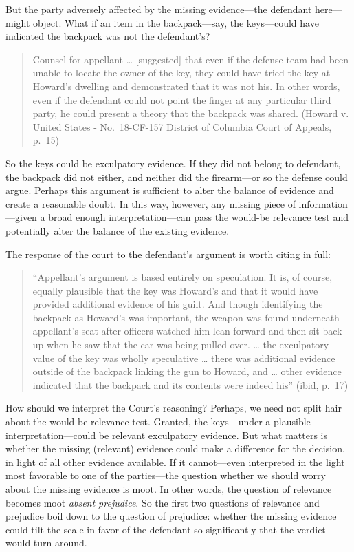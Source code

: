 \documentclass[
  10pt,
  dvipsnames,enabledeprecatedfontcommands]{scrartcl}
\begin{document}
But the party adversely affected by the missing evidence---the defendant
here---might object. What if an item in the backpack---say, the
keys---could have indicated the backpack was not the defendant's?

\begin{quote}
Counsel for appellant \ldots{} {[}suggested{]} that even if the defense
team had been unable to locate the owner of the key, they could have
tried the key at Howard's dwelling and demonstrated that it was not his.
In other words, even if the defendant could not point the finger at any
particular third party, he could present a theory that the backpack was
shared. (Howard v. United States - No.~18-CF-157 District of Columbia
Court of Appeals, p.~15)
\end{quote}

\noindent So the keys could be exculpatory evidence. If they did not
belong to defendant, the backpack did not either, and neither did the
firearm---or so the defense could argue. Perhaps this argument is
sufficient to alter the balance of evidence and create a reasonable
doubt. In this way, however, any missing piece of information---given a
broad enough interpretation---can pass the would-be relevance test and
potentially alter the balance of the existing evidence.

The response of the court to the defendant's argument is worth citing in
full:

\begin{quote}
``Appellant's argument is based entirely on speculation. It is, of
course, equally plausible that the key was Howard's and that it would
have provided additional evidence of his guilt. And though identifying
the backpack as Howard's was important, the weapon was found underneath
appellant's seat after officers watched him lean forward and then sit
back up when he saw that the car was being pulled over. \ldots{} the
exculpatory value of the key was wholly speculative \ldots{} there was
additional evidence outside of the backpack linking the gun to Howard,
and \ldots{} other evidence indicated that the backpack and its contents
were indeed his'' (ibid, p.~17)
\end{quote}

\noindent How should we interpret the Court's reasoning? Perhaps, we
need not split hair about the would-be-relevance test. Granted, the
keys---under a plausible interpretation---could be relevant exculpatory
evidence. But what matters is whether the missing (relevant) evidence
could make a difference for the decision, in light of all other evidence
available. If it cannot---even interpreted in the light most favorable
to one of the parties---the question whether we should worry about the
missing evidence is moot. In other words, the question of relevance
becomes moot \emph{absent prejudice}. So the first two questions of
relevance and prejudice boil down to the question of prejudice: whether
the missing evidence could tilt the scale in favor of the defendant so
significantly that the verdict would turn around.
\end{document}
